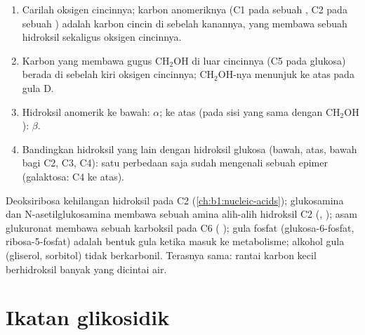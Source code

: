 \begin{method}\label{met:b1:carbohydrates:haworth}
\begin{enumerate}
  \item Carilah oksigen cincinnya; karbon anomeriknya (C1 pada sebuah
        , C2 pada sebuah ) adalah karbon cincin di
        sebelah kanannya, yang membawa sebuah hidroksil sekaligus
        oksigen cincinnya.
  \item Karbon yang membawa gugus $\mathrm{CH_2OH}$ di luar cincinnya
        (C5 pada glukosa) berada di sebelah kiri oksigen cincinnya;
        $\mathrm{CH_2OH}$-nya menunjuk ke atas pada gula D.
  \item Hidroksil anomerik ke bawah: $\alpha$; ke atas (pada sisi yang
        sama dengan
        $\mathrm{CH_2OH}$): $\beta$.
  \item Bandingkan hidroksil yang lain dengan hidroksil glukosa (bawah,
        atas, bawah bagi C2, C3, C4): satu perbedaan saja sudah mengenali
        sebuah epimer (galaktosa: C4 ke atas).
\end{enumerate}
\end{method}

\begin{example}\label{ex:b1:carbohydrates:derivatives}
Deoksiribosa kehilangan hidroksil pada C2 (\cref{ch:b1:nucleic-acids});
glukosamina dan N-asetilglukosamina membawa sebuah amina alih-alih
hidroksil C2 (, ); asam glukuronat membawa sebuah
karboksil pada C6 ( ); gula fosfat
(glukosa-6-fosfat, ribosa-5-fosfat) adalah bentuk gula ketika masuk ke
metabolisme; alkohol gula (gliserol, sorbitol) tidak berkarbonil.
Terasnya sama: rantai karbon kecil berhidroksil banyak yang dicintai air.
\end{example}

\section{Ikatan glikosidik}

